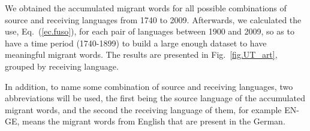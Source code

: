 \documentclass[10pt,letterpaper]{article} %
\newcommand{\eref}[1]{Eq.~(\ref{#1})}
\newcommand{\fref}[1]{Fig.~\ref{#1}}
\begin{document}
We obtained the accumulated migrant words for all possible combinations of
source and receiving languages from 1740 to 2009.  Afterwards, we calculated
the use, \eref{ec.fuso},  for each pair of languages between 1900 and 2009, so
as to have a time period (1740-1899) to build a large enough dataset to have
meaningful migrant words. The results are presented in \fref{fig.UT_art}, 
grouped by receiving language. 


% 
In addition, to name some combination of source
and receiving languages, two abbreviations will be used, the first being the
source language of the accumulated migrant words, and the second the receiving
language of them, for example EN-GE, means the migrant words from English that
are present in the German.




\end{document}
